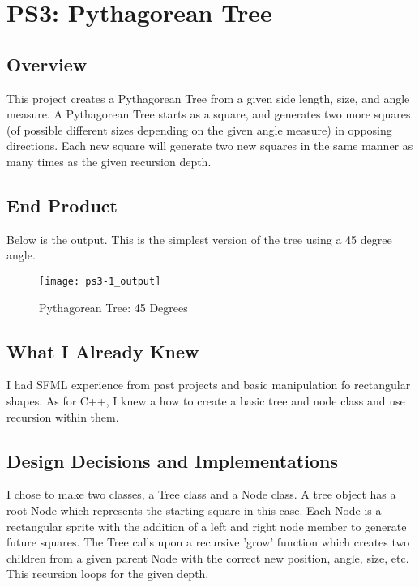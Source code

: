 \section{PS3: Pythagorean Tree}\label{sec:ps3}

\subsection{Overview}\label{sec:ps3:overview} %

This project creates a Pythagorean Tree from a given side length, size, and angle measure.
A Pythagorean Tree starts as a square, and generates two more squares (of possible different sizes depending on the given angle measure) in opposing directions.
Each new square will generate two new squares in the same manner as many times as the given recursion depth.

\subsection{End Product}\label{sec:ps3:accomplish} %

Below is the output.
This is the simplest version of the tree using a 45 degree angle.

\begin{figure}[h]
\centering
\begin{minipage}[b]{0.4\textwidth}
\texttt{[image: ps3-1\_output]}
\caption{Pythagorean Tree: 45 Degrees}
\end{minipage}
\end{figure}

\subsection{What I Already Knew}\label{sec:ps3:knew} %

I had SFML experience from past projects and basic manipulation fo rectangular shapes.
As for C++, I knew a how to create a basic tree and node class and use recursion within them.

\subsection{Design Decisions and Implementations}\label{sec:ps3:decisions} %

I chose to make two classes, a Tree class and a Node class.
A tree object has a root Node which represents the starting square in this case.
Each Node is a rectangular sprite with the addition of a left and right node member to generate future squares.
The Tree calls upon a recursive 'grow' function which creates two children from a given parent Node with the correct new position, angle, size, etc.
This recursion loops for the given depth.

